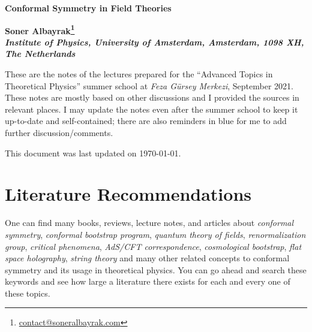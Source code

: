 \documentclass[12pt]{article}
\newcommand\draftnote[1]{{\color{blue} #1}}
\numberwithin{equation}{section}
\begin{document}
	\vspace*{-.6in} \thispagestyle{empty}
	\begin{flushright}
	\end{flushright}
	\vspace{.2in} {\Large
		\begin{center}
			{\bf Conformal Symmetry in Field Theories\vspace{.1in}}
		\end{center}
	}
	\vspace{.2in}
	\begin{center}
		{\bf 
			Soner Albayrak\footnote{\href{mailto:contact@soneralbayrak.com}{contact@soneralbayrak.com}}
		\\
		\vspace{.2in} 
		{\it  Institute of Physics, University of Amsterdam, Amsterdam, 1098 XH, The Netherlands}}
	\end{center}
	
	\vspace{.2in}

		These are the notes of the lectures prepared for the ``Advanced Topics in Theoretical Physics''  summer school at \emph{Feza Gürsey Merkezi}, September 2021. These notes are mostly based on other discussions and I provided the sources  in relevant places. I may update the notes even after the summer school to keep it up-to-date and self-contained; there are also reminders \draftnote{in blue} for me to add further discussion/comments.
		\par This document was last updated on \today.
	
	\newpage

\tableofcontents
\clearpage
{}%
\section*{Literature Recommendations}
One can find many books, reviews, lecture notes, and articles about \emph{conformal symmetry}, \emph{conformal bootstrap program}, \emph{quantum theory of fields}, \emph{renormalization group}, \emph{critical phenomena}, \emph{AdS/CFT correspondence}, \emph{cosmological bootstrap}, \emph{flat space holography}, \emph{string theory} and many other related concepts to conformal symmetry and its usage in theoretical physics. You can go ahead and search these keywords and see how large a literature there exists for each and every one of these topics.
\end{document}
